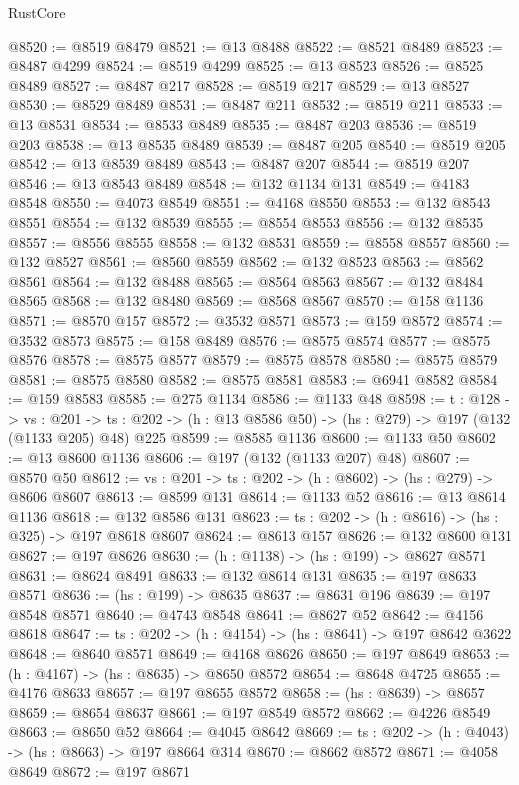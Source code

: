 \begin{lexlean}{RustCore}
\begin{coremodule}
@8520 := @8519 @8479
@8521 := @13 @8488
@8522 := @8521 @8489
@8523 := @8487 @4299
@8524 := @8519 @4299
@8525 := @13 @8523
@8526 := @8525 @8489
@8527 := @8487 @217
@8528 := @8519 @217
@8529 := @13 @8527
@8530 := @8529 @8489
@8531 := @8487 @211
@8532 := @8519 @211
@8533 := @13 @8531
@8534 := @8533 @8489
@8535 := @8487 @203
@8536 := @8519 @203
@8538 := @13 @8535 @8489
@8539 := @8487 @205
@8540 := @8519 @205
@8542 := @13 @8539 @8489
@8543 := @8487 @207
@8544 := @8519 @207
@8546 := @13 @8543 @8489
@8548 := @132 @1134 @131
@8549 := @4183 @8548
@8550 := @4073 @8549
@8551 := @4168 @8550
@8553 := @132 @8543 @8551
@8554 := @132 @8539
@8555 := @8554 @8553
@8556 := @132 @8535
@8557 := @8556 @8555
@8558 := @132 @8531
@8559 := @8558 @8557
@8560 := @132 @8527
@8561 := @8560 @8559
@8562 := @132 @8523
@8563 := @8562 @8561
@8564 := @132 @8488
@8565 := @8564 @8563
@8567 := @132 @8484 @8565
@8568 := @132 @8480
@8569 := @8568 @8567
@8570 := @158 @1136
@8571 := @8570 @157
@8572 := @3532 @8571
@8573 := @159 @8572
@8574 := @3532 @8573
@8575 := @158 @8489
@8576 := @8575 @8574
@8577 := @8575 @8576
@8578 := @8575 @8577
@8579 := @8575 @8578
@8580 := @8575 @8579
@8581 := @8575 @8580
@8582 := @8575 @8581
@8583 := @6941 @8582
@8584 := @159 @8583
@8585 := @275 @1134
@8586 := @1133 @48
@8598 := {t : @128} ->
  {vs : @201} ->
  {ts : @202} -> (h : @13 @8586 @50) -> (hs : @279) -> @197 (@132 (@1133 @205) @48) @225
@8599 := @8585 @1136
@8600 := @1133 @50
@8602 := @13 @8600 @1136
@8606 := @197 (@132 (@1133 @207) @48)
@8607 := @8570 @50
@8612 := {vs : @201} -> {ts : @202} -> (h : @8602) -> (hs : @279) -> @8606 @8607
@8613 := @8599 @131
@8614 := @1133 @52
@8616 := @13 @8614 @1136
@8618 := @132 @8586 @131
@8623 := {ts : @202} -> (h : @8616) -> (hs : @325) -> @197 @8618 @8607
@8624 := @8613 @157
@8626 := @132 @8600 @131
@8627 := @197 @8626
@8630 := (h : @1138) -> (hs : @199) -> @8627 @8571
@8631 := @8624 @8491
@8633 := @132 @8614 @131
@8635 := @197 @8633 @8571
@8636 := (hs : @199) -> @8635
@8637 := @8631 @196
@8639 := @197 @8548 @8571
@8640 := @4743 @8548
@8641 := @8627 @52
@8642 := @4156 @8618
@8647 := {ts : @202} -> (h : @4154) -> (hs : @8641) -> @197 @8642 @3622
@8648 := @8640 @8571
@8649 := @4168 @8626
@8650 := @197 @8649
@8653 := (h : @4167) -> (hs : @8635) -> @8650 @8572
@8654 := @8648 @4725
@8655 := @4176 @8633
@8657 := @197 @8655 @8572
@8658 := (hs : @8639) -> @8657
@8659 := @8654 @8637
@8661 := @197 @8549 @8572
@8662 := @4226 @8549
@8663 := @8650 @52
@8664 := @4045 @8642
@8669 := {ts : @202} -> (h : @4043) -> (hs : @8663) -> @197 @8664 @314
@8670 := @8662 @8572
@8671 := @4058 @8649
@8672 := @197 @8671

\end{coremodule}
\end{lexlean}
